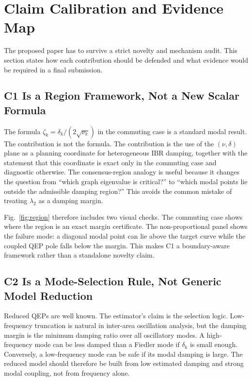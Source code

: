 \documentclass[journal]{IEEEtran}
\begin{document}
\section{Claim Calibration and Evidence Map}

The proposed paper has to survive a strict novelty and mechanism audit. This section states how each contribution should be defended and what evidence would be required in a final submission.

\subsection{C1 Is a Region Framework, Not a New Scalar Formula}

The formula $\zeta_k=\delta_k/(2\sqrt{\nu_k})$ in the commuting case is a standard modal result. The contribution is not the formula. The contribution is the use of the $(\nu,\delta)$ plane as a planning coordinate for heterogeneous IBR damping, together with the statement that this coordinate is exact only in the commuting case and diagnostic otherwise. The consensus-region analogy is useful because it changes the question from ``which graph eigenvalue is critical?'' to ``which modal points lie outside the admissible damping region?'' This avoids the common mistake of treating $\lambda_2$ as a damping margin.

Fig.~\ref{fig:region} therefore includes two visual checks. The commuting case shows where the region is an exact margin certificate. The non-proportional panel shows the failure mode: a diagonal modal point can lie above the target curve while the coupled QEP pole falls below the margin. This makes C1 a boundary-aware framework rather than a standalone novelty claim.

\subsection{C2 Is a Mode-Selection Rule, Not Generic Model Reduction}

Reduced QEPs are well known. The estimator's claim is the selection logic. Low-frequency truncation is natural in inter-area oscillation analysis, but the damping margin is the minimum damping ratio over all oscillatory modes. A high-frequency mode can be less damped than a Fiedler mode if $\delta_k$ is small enough. Conversely, a low-frequency mode can be safe if its modal damping is large. The reduced model should therefore be built from low estimated damping and strong modal coupling, not from frequency alone.
\end{document}
